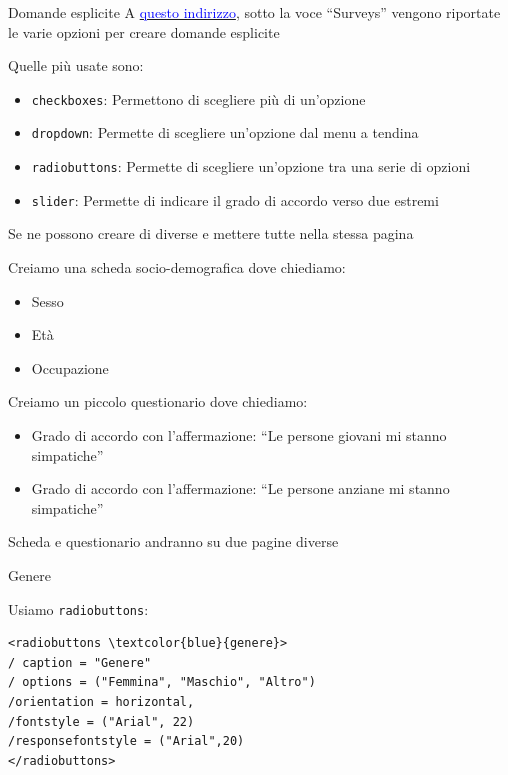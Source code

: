 \documentclass{beamer}
\begin{document}
\begin{frame}{Domande esplicite}
	A \href{https://www.millisecond.com/support/docs/current/html/language/languagereference.htm}{\textcolor{blue}{questo indirizzo}}, sotto la voce ``Surveys'' vengono riportate le varie opzioni per creare domande esplicite 
	
	Quelle più usate sono: 
	
	\begin{itemize}
	 \item \texttt{checkboxes}: Permettono di scegliere più di un'opzione
	 \item  \texttt{dropdown}: Permette di scegliere un'opzione dal menu a tendina
	 \item \texttt{radiobuttons}: Permette di scegliere un'opzione tra una serie di opzioni
	 \item \texttt{slider}: Permette di indicare il grado di accordo verso due estremi
	\end{itemize}

Se ne possono creare di diverse e mettere tutte nella stessa pagina 
\end{frame}

\begin{frame}
	Creiamo una scheda socio-demografica dove chiediamo: 
	
	\begin{itemize}
		\item Sesso
		\item Età 
		\item Occupazione
	\end{itemize}

Creiamo un piccolo questionario dove chiediamo: 
\begin{itemize}
	\item Grado di accordo con l'affermazione: ``Le persone giovani mi stanno simpatiche''
	\item Grado di accordo con l'affermazione: ``Le persone anziane mi stanno simpatiche''
\end{itemize}

Scheda e questionario andranno su due pagine diverse
\end{frame}

\begin{frame}[fragile]{Genere}
	
	Usiamo \texttt{radiobuttons}: 
	
	\begin{Verbatim}[commandchars=\\\{\}]
<radiobuttons \textcolor{blue}{genere}>
/ caption = "Genere"
/ options = ("Femmina", "Maschio", "Altro")
/orientation = horizontal, 
/fontstyle = ("Arial", 22)
/responsefontstyle = ("Arial",20)
</radiobuttons>
	\end{Verbatim}
	
\end{frame}
\end{document}
